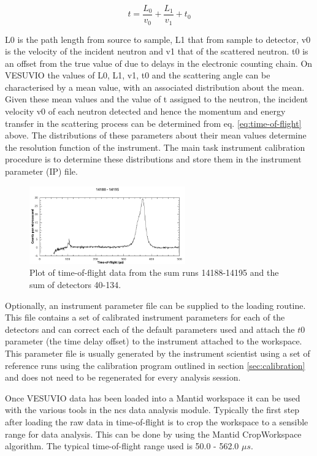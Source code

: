 \documentclass[paper=a4, fontsize=11pt]{scrartcl}	%
\numberwithin{equation}{section}															%
\numberwithin{figure}{section}																%
\numberwithin{table}{section}
\begin{document}
\begin{equation}
\label{eq:time-of-flight}
t = \frac{L_0}{v_0} + \frac{L_1}{v_1} + t_0
\end{equation}

L0 is the path length from source to sample, L1 that from sample to detector, v0 is the velocity of the incident neutron and v1 that of the scattered neutron. t0 is an offset from the true value of due to delays in the electronic counting chain. On VESUVIO the values of L0, L1, v1, t0 and the scattering angle can be characterised by a mean value, with an associated distribution about the mean. Given these mean values and the value of t assigned to the neutron, the incident velocity v0 of each neutron detected and hence the
momentum and energy transfer in the scattering process can be determined from eq. \ref{eq:time-of-flight} above. The distributions of these parameters about their mean values determine the resolution function of the instrument. The main task instrument calibration procedure is to determine these distributions and store them in the instrument parameter (IP) file.

\begin{figure}[H]
\centering
\includegraphics[width=0.6\textwidth]{img/tof-spectrum.png}
\caption{Plot of time-of-flight data from the sum runs 14188-14195 and the sum of detectors 40-134.}
\label{fig:tof-spectrum}
\end{figure}

Optionally, an instrument parameter file can be supplied to the loading routine. This file contains a set of calibrated instrument parameters for each of the detectors and can correct each of the default parameters used and attach the $t0$ parameter (the time delay offset)\cite{mayers2011calibration} to the instrument attached to the workspace. This parameter file is usually generated by the instrument scientist using a set of reference runs using the calibration program outlined in section \ref{sec:calibration} and does not need to be regenerated for every analysis session. 

Once VESUVIO data has been loaded into a Mantid workspace it can be used with the various tools in the ncs data analysis module. Typically the first step after loading the raw data in time-of-flight is to crop the workspace to a sensible range for data analysis. This can be done by using the Mantid CropWorkspace algorithm. The typical time-of-flight range used is 50.0 - 562.0 $\mu s$.
\end{document}

